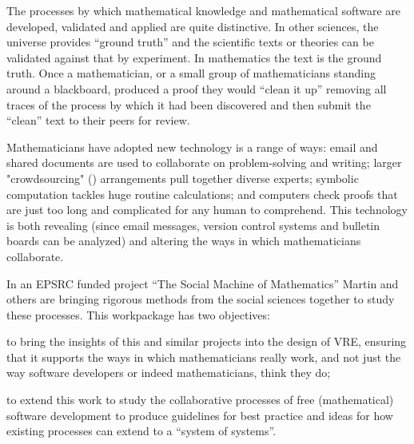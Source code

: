 \begin{workpackage}[id=social-aspects,wphases=0-48,
  title=Social Aspects,
  lead=UO,
  UORM=53,USHRM=8, USORM=5]


\begin{wpobjectives}

The processes by which mathematical knowledge and mathematical
software are developed, validated and applied are quite
distinctive. In other sciences, the universe provides ``ground truth''
and the scientific texts or theories can be validated against that by
experiment. In mathematics the text is the ground truth. Once 
 a mathematician, or a small group of
mathematicians standing around a blackboard, produced a proof they
would ``clean it up'' removing all traces of the process by which it
had been discovered and then submit the ``clean'' text to their peers
for review. 

Mathematicians have adopted new technology is a range of ways: email
and shared documents are used to collaborate on problem-solving and
writing; larger "crowdsourcing" () arrangements
pull together diverse  experts; symbolic computation tackles huge routine
calculations; and computers  check  proofs that are just too long and 
complicated for any human to comprehend. This technology is both
revealing (since email messages, version control systems and bulletin
boards can be analyzed) and altering the ways in which mathematicians
collaborate. 

In an EPSRC funded project ``The Social Machine of Mathematics''
Martin and others are bringing rigorous methods from the social 
sciences together to study these processes. This workpackage has two
objectives: \begin{compactitem}
\item to bring the insights of this and similar projects into the
  design of \TheProject VRE, ensuring that it supports the ways in
  which mathematicians really work, and not just the way software
  developers or indeed mathematicians, think they do;
\item to extend this work to study the collaborative processes of free
  (mathematical) software development to produce guidelines for best
  practice and ideas for how existing processes can extend to a
  ``system of systems''.
\item {}
\end{compactitem} 




\end{wpobjectives}
\end{workpackage}
